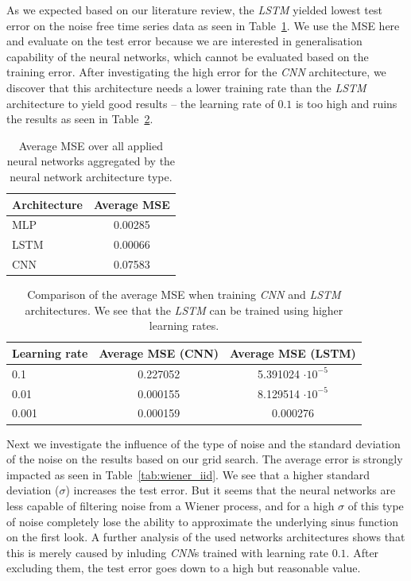 As we expected based on our literature review, the \emph{LSTM} yielded lowest 
test error
on the noise free time series data as seen in Table~\ref{tab:noisefree_result}.
We use the MSE here and evaluate on the test error because we are interested in 
generalisation capability of the neural networks, which cannot be evaluated 
based on the training error.
After investigating the high error for the \emph{CNN} architecture, we discover
that this architecture needs a lower training rate than the \emph{LSTM}
architecture to yield good results -- the learning rate of $0.1$ is too high
and ruins the results as seen in Table~\ref{tab:cnn_training}.

\begin{table}
    \centering
    \begin{tabular}{l|c}
        Architecture & Average MSE \\
        \hline
        MLP          & 0.00285     \\
        LSTM         & 0.00066     \\
        CNN          & 0.07583     \\
    \end{tabular}
    \caption{Average MSE over all applied neural networks aggregated by
        the neural network architecture type.}
    \label{tab:noisefree_result}
\end{table}

\begin{table}
    \centering
    \begin{tabular}{l|c|c}
        Learning rate & Average MSE (CNN) & Average MSE (LSTM)       \\
        \hline
        0.1           & 0.227052          & 5.391024 $\cdot 10^{-5}$ \\
        0.01          & 0.000155          & 8.129514 $\cdot 10^{-5}$ \\
        0.001         & 0.000159          & 0.000276                 \\
    \end{tabular}
    \caption{Comparison of the average MSE when training \emph{CNN} and
        \emph{LSTM} architectures. We see that the \emph{LSTM} can be trained
        using higher learning rates.}
    \label{tab:cnn_training}
\end{table}

Next we investigate the influence of the type of noise
and the standard deviation of the noise on the results 
based on our grid search. The average error is
strongly impacted as seen in Table~\ref{tab:wiener_iid}. We see that
a higher standard deviation ($\sigma$)
increases the test error. But it seems that the 
neural networks are less capable of filtering noise from a Wiener process, and 
for a high $\sigma$ of this type of noise completely lose the ability to 
approximate the underlying sinus function on the first look. A further analysis
of the used networks architectures shows that this is merely caused by inluding 
\emph{CNN}s trained with learning rate $0.1$. After excluding them, the test 
error goes down to a high but reasonable value.

